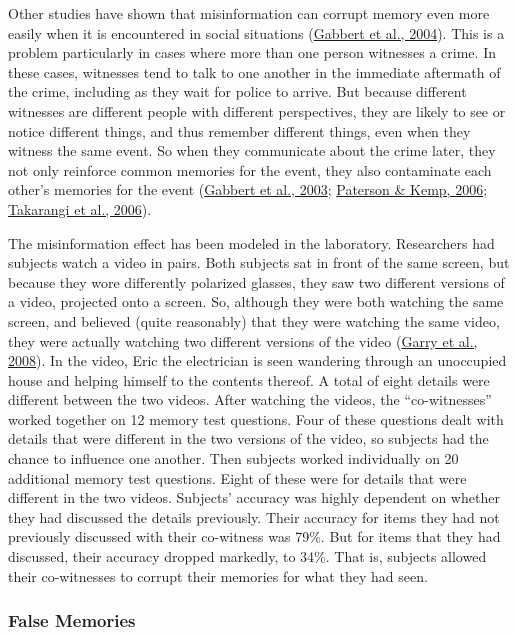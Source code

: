 \documentclass[
]{krantz}
\begin{document}
Other studies have shown that misinformation can corrupt memory even more easily when it is encountered in social situations (\protect\hyperlink{ref-gabbert2004say}{Gabbert et al., 2004}). This is a problem particularly in cases where more than one person witnesses a crime. In these cases, witnesses tend to talk to one another in the immediate aftermath of the crime, including as they wait for police to arrive. But because different witnesses are different people with different perspectives, they are likely to see or notice different things, and thus remember different things, even when they witness the same event. So when they communicate about the crime later, they not only reinforce common memories for the event, they also contaminate each other's memories for the event (\protect\hyperlink{ref-gabbert2003memory}{Gabbert et al., 2003}; \protect\hyperlink{ref-paterson2006co}{Paterson \& Kemp, 2006}; \protect\hyperlink{ref-takarangi2006modernising}{Takarangi et al., 2006}).

The misinformation effect has been modeled in the laboratory. Researchers had subjects watch a video in pairs. Both subjects sat in front of the same screen, but because they wore differently polarized glasses, they saw two different versions of a video, projected onto a screen. So, although they were both watching the same screen, and believed (quite reasonably) that they were watching the same video, they were actually watching two different versions of the video (\protect\hyperlink{ref-garry2008eyewitness}{Garry et al., 2008}). In the video, Eric the electrician is seen wandering through an unoccupied house and helping himself to the contents thereof. A total of eight details were different between the two videos. After watching the videos, the ``co-witnesses'' worked together on 12 memory test questions. Four of these questions dealt with details that were different in the two versions of the video, so subjects had the chance to influence one another. Then subjects worked individually on 20 additional memory test questions. Eight of these were for details that were different in the two videos. Subjects' accuracy was highly dependent on whether they had discussed the details previously. Their accuracy for items they had not previously discussed with their co-witness was 79\%. But for items that they had discussed, their accuracy dropped markedly, to 34\%. That is, subjects allowed their co-witnesses to corrupt their memories for what they had seen.

\hypertarget{false-memories}{%
\subsubsection*{False Memories}\label{false-memories}}
\end{document}
